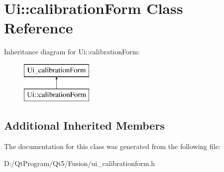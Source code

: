 \hypertarget{class_ui_1_1calibration_form}{}\section{Ui\+:\+:calibration\+Form Class Reference}
\label{class_ui_1_1calibration_form}
Inheritance diagram for Ui\+:\+:calibration\+Form\+:\begin{figure}[H]
\begin{center}
\leavevmode
\includegraphics[height=2.000000cm]{class_ui_1_1calibration_form}
\end{center}
\end{figure}
\subsection*{Additional Inherited Members}


The documentation for this class was generated from the following file\+:\begin{DoxyCompactItemize}
\item 
D\+:/\+Qt\+Program/\+Qt5/\+Fusion/ui\+\_\+calibrationform.\+h\end{DoxyCompactItemize}
